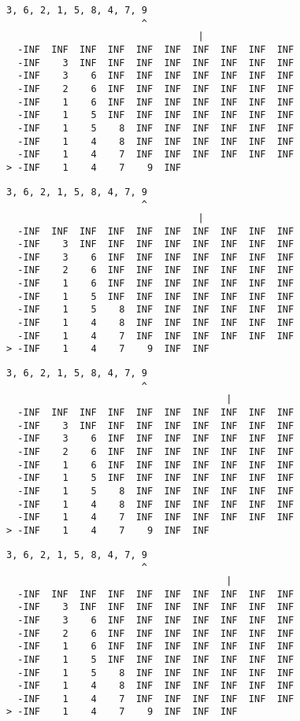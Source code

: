 { \begin{verbatim}
3, 6, 2, 1, 5, 8, 4, 7, 9
                        ^
                                  |
  -INF  INF  INF  INF  INF  INF  INF  INF  INF  INF
  -INF    3  INF  INF  INF  INF  INF  INF  INF  INF
  -INF    3    6  INF  INF  INF  INF  INF  INF  INF
  -INF    2    6  INF  INF  INF  INF  INF  INF  INF
  -INF    1    6  INF  INF  INF  INF  INF  INF  INF
  -INF    1    5  INF  INF  INF  INF  INF  INF  INF
  -INF    1    5    8  INF  INF  INF  INF  INF  INF
  -INF    1    4    8  INF  INF  INF  INF  INF  INF
  -INF    1    4    7  INF  INF  INF  INF  INF  INF
> -INF    1    4    7    9  INF                    
\end{verbatim} }

{ \begin{verbatim}
3, 6, 2, 1, 5, 8, 4, 7, 9
                        ^
                                  |
  -INF  INF  INF  INF  INF  INF  INF  INF  INF  INF
  -INF    3  INF  INF  INF  INF  INF  INF  INF  INF
  -INF    3    6  INF  INF  INF  INF  INF  INF  INF
  -INF    2    6  INF  INF  INF  INF  INF  INF  INF
  -INF    1    6  INF  INF  INF  INF  INF  INF  INF
  -INF    1    5  INF  INF  INF  INF  INF  INF  INF
  -INF    1    5    8  INF  INF  INF  INF  INF  INF
  -INF    1    4    8  INF  INF  INF  INF  INF  INF
  -INF    1    4    7  INF  INF  INF  INF  INF  INF
> -INF    1    4    7    9  INF  INF               
\end{verbatim} }

{ \begin{verbatim}
3, 6, 2, 1, 5, 8, 4, 7, 9
                        ^
                                       |
  -INF  INF  INF  INF  INF  INF  INF  INF  INF  INF
  -INF    3  INF  INF  INF  INF  INF  INF  INF  INF
  -INF    3    6  INF  INF  INF  INF  INF  INF  INF
  -INF    2    6  INF  INF  INF  INF  INF  INF  INF
  -INF    1    6  INF  INF  INF  INF  INF  INF  INF
  -INF    1    5  INF  INF  INF  INF  INF  INF  INF
  -INF    1    5    8  INF  INF  INF  INF  INF  INF
  -INF    1    4    8  INF  INF  INF  INF  INF  INF
  -INF    1    4    7  INF  INF  INF  INF  INF  INF
> -INF    1    4    7    9  INF  INF               
\end{verbatim} }

{ \begin{verbatim}
3, 6, 2, 1, 5, 8, 4, 7, 9
                        ^
                                       |
  -INF  INF  INF  INF  INF  INF  INF  INF  INF  INF
  -INF    3  INF  INF  INF  INF  INF  INF  INF  INF
  -INF    3    6  INF  INF  INF  INF  INF  INF  INF
  -INF    2    6  INF  INF  INF  INF  INF  INF  INF
  -INF    1    6  INF  INF  INF  INF  INF  INF  INF
  -INF    1    5  INF  INF  INF  INF  INF  INF  INF
  -INF    1    5    8  INF  INF  INF  INF  INF  INF
  -INF    1    4    8  INF  INF  INF  INF  INF  INF
  -INF    1    4    7  INF  INF  INF  INF  INF  INF
> -INF    1    4    7    9  INF  INF  INF          
\end{verbatim} }

